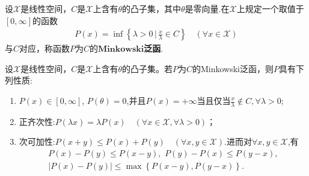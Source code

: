 \documentclass[../../main.tex]{subfiles}%
\begin{document}
\begin{definition}
设$\mathscr{X}$是线性空间，$C$是$\mathscr{X}$上含有$\theta$的凸子集，其中$\theta$是零向量.在$\mathscr{X}$上规定一个取值于$[0, \infty]$的函数
\begin{align}
P(x) = \inf \left\{ \lambda > 0 \,\bigg|\, \frac{x}{\lambda} \in C \right\} \quad (\forall x \in \mathscr{X}) \label{eq:HJJIOu3fs1.5.2}
\end{align}
与$C$对应，称函数$P$为$C$的$\mathbf{Minkowski}$\textbf{泛函}.
\end{definition}

\begin{proposition}\label{proposition:Minkowski泛函的基本性质}
设$\mathscr{X}$是线性空间，$C$是$\mathscr{X}$上含有$\theta$的凸子集。若$P$为$C$的Minkowski泛函，则$P$具有下列性质:
\begin{enumerate}[(1)]
\item\label{proposition:Minkowski泛函的基本性质-1} $P(x) \in [0, \infty]$, $P(\theta) = 0$,并且$P(x)=+\infty$当且仅当$\frac{x}{\lambda}\notin C,\forall \lambda >0$;

\item\label{proposition:Minkowski泛函的基本性质-2} 正齐次性:$P(\lambda x) = \lambda P(x) \quad (\forall x \in \mathscr{X}, \forall \lambda > 0)$；

\item\label{proposition:Minkowski泛函的基本性质-3} 次可加性:$P(x + y) \leqslant P(x) + P(y) \quad (\forall x, y \in \mathscr{X})$.进而对$\forall x,y\in \mathscr{X}$,有
\begin{gather*}
P\left( x \right) -P\left( y \right) \leqslant P\left( x-y \right) ,\,\, P\left( y \right) -P\left( x \right) \leqslant P\left( y-x \right) ,
\\
\left| P\left( x \right) -P\left( y \right) \right|\leqslant \max \left\{ P\left( x-y \right) ,P\left( y-x \right) \right\} .
\end{gather*}
\end{enumerate}
\end{proposition}
\end{document}
